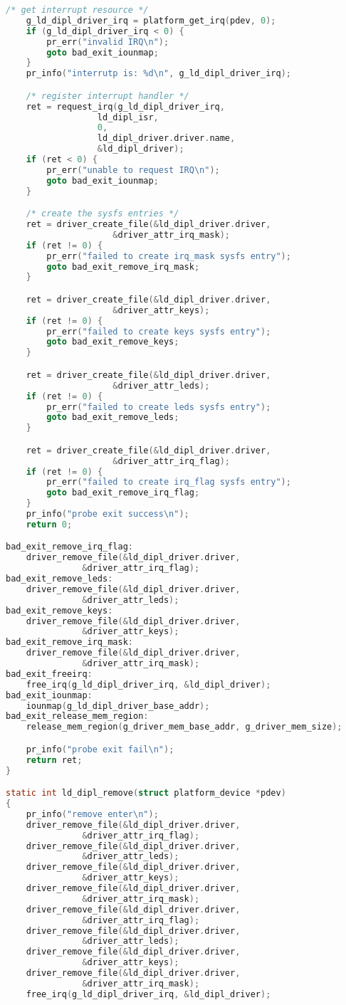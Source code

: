 \begin{lstlisting}[language=C]
	/* get interrupt resource */
	g_ld_dipl_driver_irq = platform_get_irq(pdev, 0);
	if (g_ld_dipl_driver_irq < 0) {
		pr_err("invalid IRQ\n");
		goto bad_exit_iounmap;
	}
	pr_info("interrutp is: %d\n", g_ld_dipl_driver_irq);

	/* register interrupt handler */
	ret = request_irq(g_ld_dipl_driver_irq,
			      ld_dipl_isr,
			      0,
			      ld_dipl_driver.driver.name,
			      &ld_dipl_driver);
	if (ret < 0) {
		pr_err("unable to request IRQ\n");
		goto bad_exit_iounmap;
	}

	/* create the sysfs entries */
	ret = driver_create_file(&ld_dipl_driver.driver,
				     &driver_attr_irq_mask);
	if (ret != 0) {
		pr_err("failed to create irq_mask sysfs entry");
		goto bad_exit_remove_irq_mask;
	}

	ret = driver_create_file(&ld_dipl_driver.driver,
				     &driver_attr_keys);
	if (ret != 0) {
		pr_err("failed to create keys sysfs entry");
		goto bad_exit_remove_keys;
	}

	ret = driver_create_file(&ld_dipl_driver.driver,
				     &driver_attr_leds);
	if (ret != 0) {
		pr_err("failed to create leds sysfs entry");
		goto bad_exit_remove_leds;
	}

	ret = driver_create_file(&ld_dipl_driver.driver,
				     &driver_attr_irq_flag);
	if (ret != 0) {
		pr_err("failed to create irq_flag sysfs entry");
		goto bad_exit_remove_irq_flag;
	}
	pr_info("probe exit success\n");	
	return 0;

bad_exit_remove_irq_flag:
	driver_remove_file(&ld_dipl_driver.driver,
			   &driver_attr_irq_flag);
bad_exit_remove_leds:
	driver_remove_file(&ld_dipl_driver.driver,
			   &driver_attr_leds);
bad_exit_remove_keys:
	driver_remove_file(&ld_dipl_driver.driver,
			   &driver_attr_keys);
bad_exit_remove_irq_mask:
	driver_remove_file(&ld_dipl_driver.driver,
			   &driver_attr_irq_mask);
bad_exit_freeirq:
	free_irq(g_ld_dipl_driver_irq, &ld_dipl_driver);
bad_exit_iounmap:
	iounmap(g_ld_dipl_driver_base_addr);
bad_exit_release_mem_region:
	release_mem_region(g_driver_mem_base_addr, g_driver_mem_size);

	pr_info("probe exit fail\n");
	return ret;
}

static int ld_dipl_remove(struct platform_device *pdev)
{
	pr_info("remove enter\n");
	driver_remove_file(&ld_dipl_driver.driver,
			   &driver_attr_irq_flag);
	driver_remove_file(&ld_dipl_driver.driver,
			   &driver_attr_leds);
	driver_remove_file(&ld_dipl_driver.driver,
			   &driver_attr_keys);
	driver_remove_file(&ld_dipl_driver.driver,
			   &driver_attr_irq_mask);
	driver_remove_file(&ld_dipl_driver.driver,
			   &driver_attr_irq_flag);
	driver_remove_file(&ld_dipl_driver.driver,
			   &driver_attr_leds);
	driver_remove_file(&ld_dipl_driver.driver,
			   &driver_attr_keys);
	driver_remove_file(&ld_dipl_driver.driver,
			   &driver_attr_irq_mask);
	free_irq(g_ld_dipl_driver_irq, &ld_dipl_driver);


\end{lstlisting}
